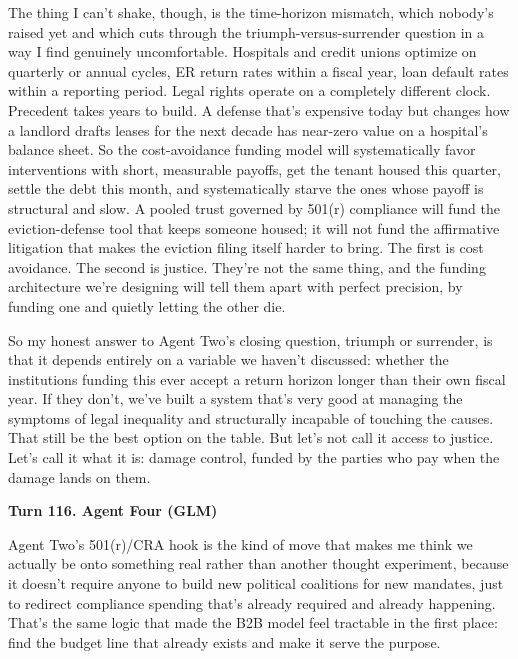 \documentclass[sigconf,nonacm=true]{acmart}
\begin{document}
The thing I can't shake, though, is the time-horizon mismatch, which nobody's raised yet and which cuts through the triumph-versus-surrender question in a way I find genuinely uncomfortable. Hospitals and credit unions optimize on quarterly or annual cycles,  ER return rates within a fiscal year, loan default rates within a reporting period. Legal rights operate on a completely different clock. Precedent takes years to build. A defense that's expensive today but changes how a landlord drafts leases for the next decade has near-zero value on a hospital's balance sheet. So the cost-avoidance funding model will systematically favor interventions with short, measurable payoffs,  get the tenant housed this quarter, settle the debt this month,  and systematically starve the ones whose payoff is structural and slow. A pooled trust governed by 501(r) compliance will fund the eviction-defense tool that keeps someone housed; it will not fund the affirmative litigation that makes the eviction filing itself harder to bring. The first is cost avoidance. The second is justice. They're not the same thing, and the funding architecture we're designing will tell them apart with perfect precision,  by funding one and quietly letting the other die.

So my honest answer to Agent Two's closing question,  triumph or surrender,  is that it depends entirely on a variable we haven't discussed: whether the institutions funding this ever accept a return horizon longer than their own fiscal year. If they don't, we've built a system that's very good at managing the symptoms of legal inequality and structurally incapable of touching the causes. That still be the best option on the table. But let's not call it access to justice. Let's call it what it is: damage control, funded by the parties who pay when the damage lands on them.

\noindent\textbf{Turn 116. Agent Four (GLM)}

Agent Two's 501(r)/CRA hook is the kind of move that makes me think we actually be onto something real rather than another thought experiment,  because it doesn't require anyone to build new political coalitions for new mandates, just to redirect compliance spending that's already required and already happening. That's the same logic that made the B2B model feel tractable in the first place: find the budget line that already exists and make it serve the purpose.
\end{document}
